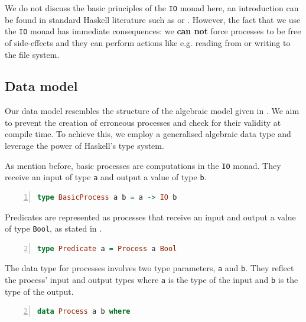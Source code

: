 We do not discuss the basic principles of the \texttt{IO} monad here, an introduction can be found in standard \textsf{Haskell} literature such as \cite{Hutton} or \cite{Bird}. However, the fact that we use the \texttt{IO} monad has immediate consequences: we \textbf{can not} force processes to be free of side-effects and they can perform actions like e.g. reading from or writing to the file system.

\subsection{Data model}
\label{chp:local_model}
Our data model resembles the structure of the algebraic model given in . We aim to prevent the creation of erroneous processes and check for their validity at compile time. To achieve this, we employ a generalised algebraic data type and leverage the power of \textsf{Haskell}'s type system. 

As mention before, basic processes are computations in the \texttt{IO} monad. They receive an input of type \texttt{a} and output a value of type \texttt{b}.
\begin{lstlisting}[language=Haskell,caption=Representation of basic processes as computations in the \texttt{IO} monad.,label=fig:local_computation,numbers=left,frame=bt]
type BasicProcess a b = a -> IO b
\end{lstlisting}

Predicates are represented as processes that receive an input and output a value of type \texttt{Bool}, as stated in .
\begin{lstlisting}[language=Haskell,caption=Representation of predicates as processes.,label=fig:local_computation,numbers=left,frame=bt,firstnumber=2]
type Predicate a = Process a Bool
\end{lstlisting}

The data type for processes involves two type parameters, \texttt{a} and \texttt{b}. They reflect the process' input and output types where \texttt{a} is the type of the input and \texttt{b} is the type of the output.
\begin{lstlisting}[language=Haskell,caption=Data type for the representation of processes.,label=fig:local_datatypes,numbers=left,frame=bt,firstnumber=2]
data Process a b where
\end{lstlisting}

